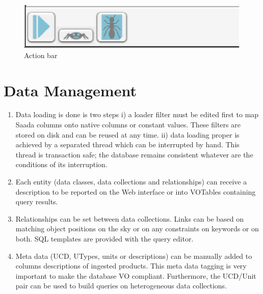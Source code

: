 \begin{figure}[!h]
	\begin{center}
		\includegraphics[height=0.10\textwidth]{part8/MICHEL_P18/P18_fig3.eps}
	\end{center}
	\caption{Action bar}
	\label{fig:fig3 (fig. 4)}
\end{figure}

\section{Data Management}
\begin{enumerate}
\item Data loading is done is two steps i) a loader filter must be edited first to map Saada columns onto native columns or constant values. These filters are stored on disk and can be reused at any time. ii) data loading proper is achieved by a separated thread which can be interrupted by hand. This thread is transaction safe; the database remains consistent whatever are the conditions of its interruption.
\item Each entity (data classes, data collections and relationships) can receive a description to be reported on the Web interface or into VOTables containing query results.
\item Relationships can be set between data collections. Links can be based on matching object positions on the sky or on any constraints on keywords or on both. SQL templates are provided with the query editor.
\item Meta data (UCD, UTypes, units or descriptions) can be manually added to columns descriptions of ingested products. This meta data tagging is very important to make the database VO compliant. Furthermore, the UCD/Unit pair can be used to build queries on heterogeneous data collections.
\end{enumerate}

